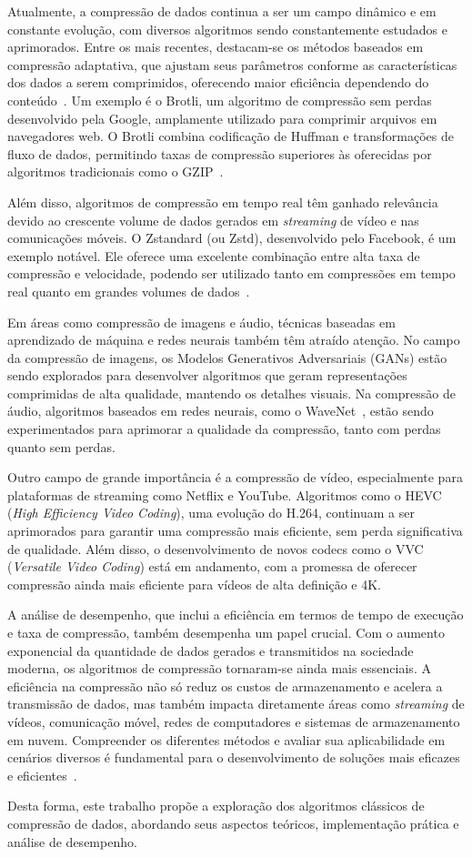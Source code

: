 Atualmente, a compressão de dados continua a ser um campo dinâmico e em constante evolução, com diversos algoritmos sendo constantemente estudados e aprimorados. Entre os mais recentes, destacam-se os métodos baseados em compressão adaptativa, que ajustam seus parâmetros conforme as características dos dados a serem comprimidos, oferecendo maior eficiência dependendo do conteúdo~\cite{salomon2007data}. Um exemplo é o Brotli, um algoritmo de compressão sem perdas desenvolvido pela Google, amplamente utilizado para comprimir arquivos em navegadores web. O Brotli combina codificação de Huffman e transformações de fluxo de dados, permitindo taxas de compressão superiores às oferecidas por algoritmos tradicionais como o GZIP~\cite{alakuijala2016brotli}.  

Além disso, algoritmos de compressão em tempo real têm ganhado relevância devido ao crescente volume de dados gerados em \textit{streaming} de vídeo e nas comunicações móveis. O Zstandard (ou Zstd), desenvolvido pelo Facebook, é um exemplo notável. Ele oferece uma excelente combinação entre alta taxa de compressão e velocidade, podendo ser utilizado tanto em compressões em tempo real quanto em grandes volumes de dados~\cite{collet2016zstandard}.  

Em áreas como compressão de imagens e áudio, técnicas baseadas em aprendizado de máquina e redes neurais também têm atraído atenção. No campo da compressão de imagens, os Modelos Generativos Adversariais (GANs) estão sendo explorados para desenvolver algoritmos que geram representações comprimidas de alta qualidade, mantendo os detalhes visuais. Na compressão de áudio, algoritmos baseados em redes neurais, como o WaveNet~\cite{wavenet}, estão sendo experimentados para aprimorar a qualidade da compressão, tanto com perdas quanto sem perdas.  

Outro campo de grande importância é a compressão de vídeo, especialmente para plataformas de streaming como Netflix e YouTube. Algoritmos como o HEVC (\textit{High Efficiency Video Coding}), uma evolução do H.264, continuam a ser aprimorados para garantir uma compressão mais eficiente, sem perda significativa de qualidade. Além disso, o desenvolvimento de novos codecs como o VVC (\textit{Versatile Video Coding}) está em andamento, com a promessa de oferecer compressão ainda mais eficiente para vídeos de alta definição e 4K.  

A análise de desempenho, que inclui a eficiência em termos de tempo de execução e taxa de compressão, também desempenha um papel crucial. Com o aumento exponencial da quantidade de dados gerados e transmitidos na sociedade moderna, os algoritmos de compressão tornaram-se ainda mais essenciais. A eficiência na compressão não só reduz os custos de armazenamento e acelera a transmissão de dados, mas também impacta diretamente áreas como \textit{streaming} de vídeos, comunicação móvel, redes de computadores e sistemas de armazenamento em nuvem. Compreender os diferentes métodos e avaliar sua aplicabilidade em cenários diversos é fundamental para o desenvolvimento de soluções mais eficazes e eficientes~\cite{salomon2007data}.

Desta forma, este trabalho propõe a exploração dos algoritmos clássicos de compressão de dados, abordando seus aspectos teóricos, implementação prática e análise de desempenho.
